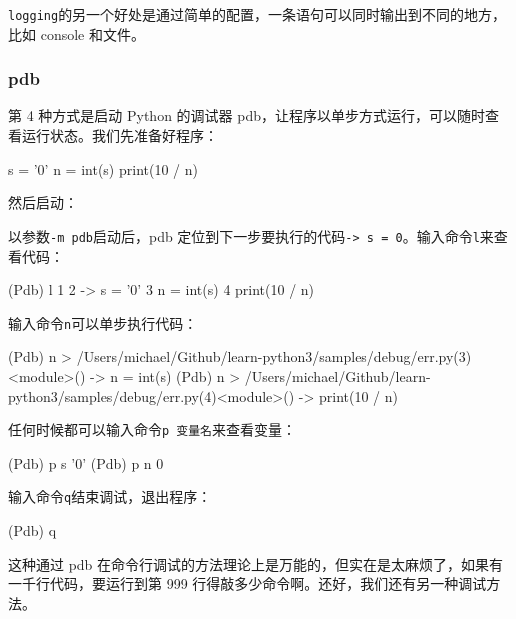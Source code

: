 \texttt{logging}的另一个好处是通过简单的配置，一条语句可以同时输出到不同的地方，比如
console 和文件。

\hypertarget{pdb}{%
\subsubsection{pdb}\label{pdb}}

第 4 种方式是启动 Python 的调试器
pdb，让程序以单步方式运行，可以随时查看运行状态。我们先准备好程序：

\begin{pythoncode}
s = '0'
n = int(s)
print(10 / n)
\end{pythoncode}

然后启动：


以参数\texttt{-m\ pdb}启动后，pdb
定位到下一步要执行的代码\texttt{-\textgreater{}\ s\ =\ \textquotesingle{}0\textquotesingle{}}。输入命令\texttt{l}来查看代码：

\begin{pythoncode}
(Pdb) l
  1     
  2  -> s = '0'
  3     n = int(s)
  4     print(10 / n)
\end{pythoncode}

输入命令\texttt{n}可以单步执行代码：

\begin{pythoncode}
(Pdb) n
> /Users/michael/Github/learn-python3/samples/debug/err.py(3)<module>()
-> n = int(s)
(Pdb) n
> /Users/michael/Github/learn-python3/samples/debug/err.py(4)<module>()
-> print(10 / n)
\end{pythoncode}

任何时候都可以输入命令\texttt{p\ 变量名}来查看变量：

\begin{pythoncode}
(Pdb) p s
'0'
(Pdb) p n
0
\end{pythoncode}

输入命令\texttt{q}结束调试，退出程序：

\begin{pythoncode}
(Pdb) q
\end{pythoncode}

这种通过 pdb
在命令行调试的方法理论上是万能的，但实在是太麻烦了，如果有一千行代码，要运行到第
999 行得敲多少命令啊。还好，我们还有另一种调试方法。

